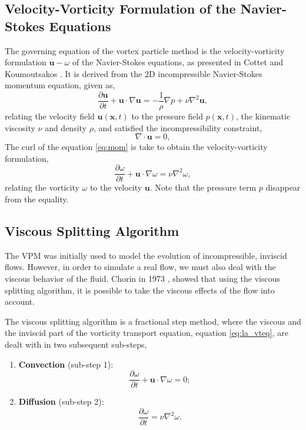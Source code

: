  
\subsection{Velocity-Vorticity Formulation of the Navier-Stokes Equations}
The governing equation of the vortex particle method is the velocity-vorticity formulation $\mathbf{u}-\omega$ of the Navier-Stokes equations, as presented in Cottet and Koumoutsakos \cite{Cottet2000a}. It is derived from the 2D incompressible Navier-Stokes momentum equation, given as,
	\begin{equation}
	\frac{\partial \mathbf{u}}{\partial t} + \mathbf{u}\cdot\nabla\mathbf{u} = - \frac{1}{\rho} \nabla p + \nu \nabla^2\mathbf{u},
	\label{eq:mom}
	\end{equation}
relating the velocity field $\mathbf{u}\left(\mathbf{x},t\right)$ to the pressure field $p\left(\mathbf{x},t\right)$, the kinematic viscosity $\nu$ and density $\rho$, and satisfied the incompressibility constraint,
	\begin{equation}
	\nabla\cdot\mathbf{u} = 0,
	\label{eq:la_ic}
	\end{equation}
The curl of the equation \ref{eq:mom} is take to obtain the velocity-vorticity formulation, 
	\begin{equation}
	\frac{\partial \omega}{\partial t} + \mathbf{u}\cdot\nabla\omega = \nu \nabla^2 \omega,
	\label{eq:la_vteq}
	\end{equation}
relating the vorticity $\omega$ to the velocity $\mathbf{u}$. Note that the pressure term $p$ disappear  from the equality.

\subsection{Viscous Splitting Algorithm}
\label{subsec:vsa}
The VPM was initially used to model the evolution of incompressible, inviscid flows. However, in order to simulate a real flow, we must also deal with the viscous behavior of the fluid. Chorin in 1973 \cite{Chorin1973a}, showed that using the viscous splitting algorithm, it is possible to take the viscous effects of the flow into account. 

The viscous splitting algorithm is a fractional step method, where the viscous and the inviscid part of the vorticity transport equation, equation \ref{eq:la_vteq}, are dealt with in two subsequent sub-steps,

	\begin{enumerate}
	\item \textbf{Convection} (sub-step 1):
		\begin{equation}
		\frac{\partial\omega}{\partial t} + \mathbf{u}\cdot\nabla\omega=0;
		\label{eq:convectionEulerian}
		\end{equation}
		
	\item \textbf{Diffusion} (sub-step 2):
		\begin{equation}
		\frac{\partial\omega}{\partial t} = \nu\nabla^2\omega.
		\label{eq:vsa2}
		\end{equation}
	\end{enumerate}

